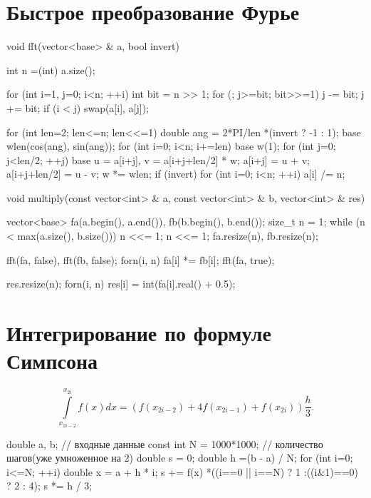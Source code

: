 \documentclass[12pt, titlepage]{article}
\begin{document}
\section{Быстрое преобразование Фурье}
\begin{cppcode}
void fft(vector<base> & a, bool invert) {
    int n =(int) a.size();

    for (int i=1, j=0; i<n; ++i) {
        int bit = n >> 1;
        for (; j>=bit; bit>>=1)
            j -= bit;
        j += bit;
        if (i < j)
            swap(a[i], a[j]);
    }

    for (int len=2; len<=n; len<<=1) {
        double ang = 2*PI/len *(invert ? -1 : 1);
        base wlen(cos(ang), sin(ang));
        for (int i=0; i<n; i+=len) {
            base w(1);
            for (int j=0; j<len/2; ++j) {
                base u = a[i+j],  v = a[i+j+len/2] * w;
                a[i+j] = u + v;
                a[i+j+len/2] = u - v;
                w *= wlen;
            }
        }
    }
    if (invert)
        for (int i=0; i<n; ++i)
            a[i] /= n;
}

void multiply(const vector<int> & a, const vector<int> & b, vector<int> & res) {
    vector<base> fa(a.begin(), a.end()), fb(b.begin(), b.end());
    size_t n = 1;
    while (n < max(a.size(), b.size()))  n <<= 1;
    n <<= 1;
    fa.resize(n), fb.resize(n);

    fft(fa, false), fft(fb, false);
    forn(i, n)
        fa[i] *= fb[i];
    fft(fa, true);

    res.resize(n);
    forn(i, n)
        res[i] = int(fa[i].real() + 0.5);
}
\end{cppcode}

\section{Интегрирование по формуле Симпсона}

\begin{equation*}
\int\limits_{x_{2i-2}}^{x_{2i}} f(x) dx = \left( f(x_{2i-2})+4f(x_{2i-1}) + f(x_{2i})\right) \frac{h}{3}.
\end{equation*}

\begin{cppcode}
double a, b; // входные данные
const int N = 1000*1000; // количество шагов(уже умноженное на 2)
double s = 0;
double h =(b - a) / N;
for (int i=0; i<=N; ++i) {
    double x = a + h * i;
    s += f(x) *((i==0 || i==N) ? 1 :((i&1)==0) ? 2 : 4);
}
s *= h / 3;
\end{cppcode}
\end{document}

